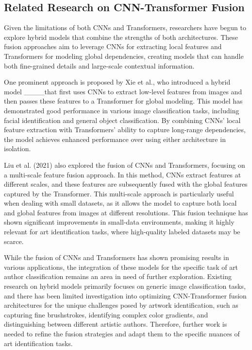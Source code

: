 \subsection{Related Research on CNN-Transformer Fusion}

Given the limitations of both CNNs and Transformers, researchers have begun to explore hybrid models that combine the strengths of both architectures. These fusion approaches aim to leverage CNNs for extracting local features and Transformers for modeling global dependencies, creating models that can handle both fine-grained details and large-scale contextual information.

One prominent approach is proposed by Xie et al., who introduced a hybrid model ____that first uses CNNs to extract low-level features from images and then passes these features to a Transformer for global modeling. This model has demonstrated good performance in various image classification tasks, including facial identification and general object classification. By combining CNNs' local feature extraction with Transformers' ability to capture long-range dependencies, the model achieves enhanced performance over using either architecture in isolation.

Liu et al. (2021) also explored the fusion of CNNs and Transformers, focusing on a multi-scale feature fusion approach. In this method, CNNs extract features at different scales, and these features are subsequently fused with the global features captured by the Transformer. This multi-scale approach is particularly useful when dealing with small datasets, as it allows the model to capture both local and global features from images at different resolutions. This fusion technique has shown significant improvements in small-data environments, making it highly relevant for art identification tasks, where high-quality labeled datasets may be scarce.

While the fusion of CNNs and Transformers has shown promising results in various applications, the integration of these models for the specific task of art author classification remains an area in need of further exploration. Existing research on hybrid models primarily focuses on generic image classification tasks, and there has been limited investigation into optimizing CNN-Transformer fusion architectures for the unique challenges posed by artwork identification, such as capturing fine brushstrokes, identifying complex color gradients, and distinguishing between different artistic authors. Therefore, further work is needed to refine the fusion strategies and adapt them to the specific nuances of art identification tasks.